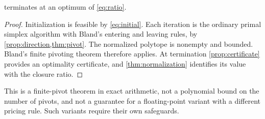 \begin{theorem}\label{thm:finite}
 terminates at an optimum of \eqref{eq:ratio}.
\end{theorem}
\begin{proof}
Initialization is feasible by \eqref{eq:initial}. Each iteration is the
ordinary primal simplex algorithm with Bland's entering and leaving rules,
by \cref{prop:direction,thm:pivot}. The normalized polytope is nonempty
and bounded. Bland's finite pivoting theorem therefore applies. At
termination \cref{prop:certificate} provides an optimality certificate,
and \cref{thm:normalization} identifies its value with the closure ratio.
\end{proof}
This is a finite-pivot theorem in exact arithmetic, not a polynomial bound
on the number of pivots, and not a guarantee for a floating-point variant
with a different pricing rule. Such variants require their own safeguards.
